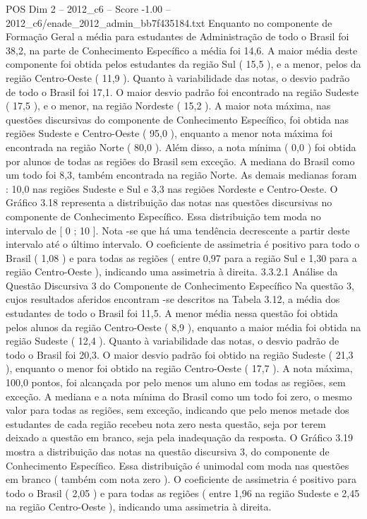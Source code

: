 \begin{textsample}{POS Dim 2 – 2012\_c6 – Score -1.00 – 2012\_c6/enade\_2012\_admin\_bb7f435184.txt}
Enquanto no componente de Formação Geral a média para estudantes de Administração de todo o Brasil foi 38,2, na parte de Conhecimento Específico a média foi 14,6.
A maior média deste componente foi obtida pelos estudantes da região Sul ( 15,5 ), e a menor, pelos da região Centro-Oeste ( 11,9 ).
Quanto à variabilidade das notas, o desvio padrão de todo o Brasil foi 17,1.
O maior desvio padrão foi encontrado na região Sudeste ( 17,5 ), e o menor, na região Nordeste ( 15,2 ).
A maior nota máxima, nas questões discursivas do componente de Conhecimento Específico, foi obtida nas regiões Sudeste e Centro-Oeste ( 95,0 ), enquanto a menor nota máxima foi encontrada na região Norte ( 80,0 ).
Além disso, a nota mínima ( 0,0 ) foi obtida por alunos de todas as regiões do Brasil sem exceção.
A mediana do Brasil como um todo foi 8,3, também encontrada na região Norte.
As demais medianas foram : 10,0 nas regiões Sudeste e Sul e 3,3 nas regiões Nordeste e Centro-Oeste.
O Gráfico 3.18 representa a distribuição das notas nas questões discursivas no componente de Conhecimento Específico.
Essa distribuição tem moda no intervalo de [ 0 ; 10 ].
Nota -se que há uma tendência decrescente a partir deste intervalo até o último intervalo.
O coeficiente de assimetria é positivo para todo o Brasil ( 1,08 ) e para todas as regiões ( entre 0,97 para a região Sul e 1,30 para a região Centro-Oeste ), indicando uma assimetria à direita. 3.3.2.1 Análise da Questão Discursiva 3 do Componente de Conhecimento Específico Na questão 3, cujos resultados aferidos encontram -se descritos na Tabela 3.12, a média dos estudantes de todo o Brasil foi 11,5.
A menor média nessa questão foi obtida pelos alunos da região Centro-Oeste ( 8,9 ), enquanto a maior média foi obtida na região Sudeste ( 12,4 ).
Quanto à variabilidade das notas, o desvio padrão de todo o Brasil foi 20,3.
O maior desvio padrão foi obtido na região Sudeste ( 21,3 ), enquanto o menor foi obtido na região Centro-Oeste ( 17,7 ).
A nota máxima, 100,0 pontos, foi alcançada por pelo menos um aluno em todas as regiões, sem exceção.
A mediana e a nota mínima do Brasil como um todo foi zero, o mesmo valor para todas as regiões, sem exceção, indicando que pelo menos metade dos estudantes de cada região recebeu nota zero nesta questão, seja por terem deixado a questão em branco, seja pela inadequação da resposta.
O Gráfico 3.19 mostra a distribuição das notas na questão discursiva 3, do componente de Conhecimento Específico.
Essa distribuição é unimodal com moda nas questões em branco ( também com nota zero ).
O coeficiente de assimetria é positivo para todo o Brasil ( 2,05 ) e para todas as regiões ( entre 1,96 na região Sudeste e 2,45 na região Centro-Oeste ), indicando uma assimetria à direita.

\end{textsample}

